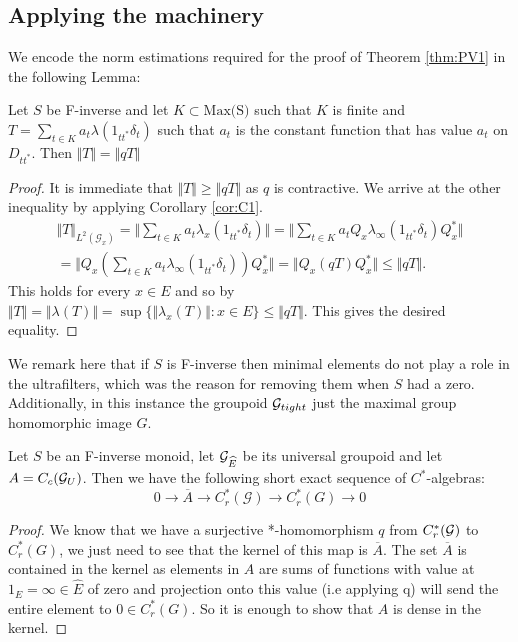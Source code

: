 \begin{corollary}
\subsection{Applying the machinery}\label{sect:S1-a}
We encode the norm estimations required for the proof of Theorem \ref{thm:PV1} in the following Lemma:
\begin{lemma}\label{lem:L3}
Let $S$ be F-inverse and let $K \subset \text{Max(S)}$ such that $K$ is finite and $T=\sum_{t \in K} a_{t}\lambda(1_{tt^{*}}\delta_{t})$ such that $a_{t}$ is the constant function that has value $a_{t}$ on $D_{tt^{*}}$. Then $\Vert T \Vert = \Vert qT \Vert$
\end{lemma}
\begin{proof}
It is immediate that $\Vert T \Vert \geq \Vert qT \Vert$ as $q$ is contractive. We arrive at the other inequality by applying Corollary \ref{cor:C1}.
\begin{eqnarray*}
\Vert T \Vert_{L^{2}(\mathcal{G}_{x})} = \Vert \sum_{t \in K} a_{t}\lambda_{x}(1_{tt^{*}}\delta_{t}) \Vert = \Vert \sum_{t \in K} a_{t}Q_{x}\lambda_{\infty}(1_{tt^{*}}\delta_{t})Q_{x}^{*} \Vert \\
= \Vert Q_{x}(\sum_{t \in K} a_{t}\lambda_{\infty}(1_{tt^{*}}\delta_{t}))Q_{x}^{*} \Vert = \Vert Q_{x}(qT)Q_{x}^{*} \Vert \leq \Vert qT \Vert.
\end{eqnarray*}
This holds for every $x \in E$ and so by  $\Vert T \Vert = \Vert \lambda(T) \Vert = \sup \lbrace \Vert \lambda_{x}(T) \Vert : x \in E \rbrace \leq \Vert qT \Vert$. This gives the desired equality.  
\end{proof}

We remark here that if $S$ is F-inverse then minimal elements do not play a role in the ultrafilters, which was the reason for removing them when $S$ had a zero. Additionally, in this instance the groupoid $\mathcal{G}_{tight}$ just the maximal group homomorphic image $G$. 

\begin{theorem}\label{thm:PV1}
Let $S$ be an F-inverse monoid, let $\mathcal{G}_{\widehat{E}}$ be its universal groupoid and let $A=C_{c}(\mathcal{G}_{U})$. Then we have the following short exact sequence of $C^{*}$-algebras:
\begin{equation*}
0 \rightarrow \overline{A} \rightarrow C^{*}_{r}(\mathcal{G}) \rightarrow C^{*}_{r}(G) \rightarrow 0
\end{equation*}
\end{theorem}
\begin{proof}

We know that we have a surjective *-homomorphism $q$ from $C^{*}_{r}(\mathcal{G})$ to $C^{*}_{r}(G)$, we just need to see that the kernel of this map is $\overline{A}$. The set $\overline{A}$ is contained in the kernel as elements in $A$ are sums of functions with value at $1_{E}=\infty \in \widehat{E}$ of zero and projection onto this value (i.e applying q) will send the entire element to $0 \in C^{*}_{r}(G)$. So it is enough to show that $A$ is dense in the kernel.


\end{proof}
\end{corollary}
